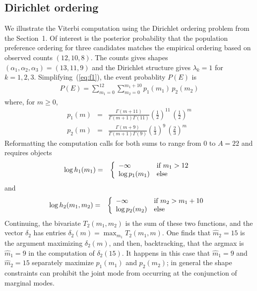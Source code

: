 \subsection{Dirichlet ordering}
We illustrate the Viterbi computation using the Dirichlet ordering
problem from the Section~1.  Of interest is the posterior probability that
the population preference ordering for three candidates matches the
empirical ordering based on observed counts $(12,10,8)$. The counts
gives shapes $(\alpha_1,\alpha_2,\alpha_3)= (13,11,9)$ and 
the Dirichlet structure gives $\lambda_k=1$
for $k=1,2,3$.  Simplifying~(\ref{eq:f1}), the event probablity $P(E)$ is
\begin{eqnarray*}
P(E) = \sum_{m_1=0}^{12} \sum_{m_2 = 0}^{m_1+10} p_1(m_1) \, p_2(m_2)
\end{eqnarray*}
where, for $m \geq 0$,
\begin{eqnarray*}
p_1(m) &=& \frac{ \Gamma(m+11)}{\Gamma(m+1) \Gamma(11) }
  \left( \frac{1}{2} \right )^{ 11 } \, \left( \frac{1}{2} \right)^m  \\
p_2(m) &=& \frac{ \Gamma(m+9) }{ \Gamma(m+1) \Gamma(9) }
  \left( \frac{1}{3} \right )^{ 9 } \, \left( \frac{2}{3} \right)^m 
\end{eqnarray*} 
Reformatting the computation 
calls for both sums to range from $0$ to $A=22$
and requires objects
\begin{eqnarray*}
\log h_1( m_1 ) &= & \left\{ 
                  \begin{array}{ll}
			- \infty & {\mbox {\rm if $m_1 > 12$ } } \\
			\log p_1(m_1) & {\mbox {\rm else} } \\
		  \end{array}
		\right.
\end{eqnarray*}
and
\begin{eqnarray*}
\log h_2( m_1, m_2 ) &= & \left\{ 
                  \begin{array}{ll}
			- \infty & {\mbox {\rm if $m_2 > m_1+ 10$ } } \\
			\log p_2(m_2) & {\mbox {\rm else} } \\
		  \end{array}
		\right.
\end{eqnarray*}
Continuing, the bivariate $T_2(m_1,m_2)$ is the sum of these two functions,
and the vector $\delta_2$ has entries 
 $\delta_2(m) = \max_{m_1} T_2(m_1,m) $.  One finds that $\hat m_2=15$
is the argument maximizing $\delta_2(m)$, and then, backtracking, that
the argmax is $\hat m_1 =  9$ in the computation of $\delta_2(15)$. 
It happens in this case that $\hat m_1 = 9$ and $\hat m_2=15$ separately
maximize $p_1(m_1)$ and $p_2(m_2)$; in general the shape constraints 
can prohibit the joint mode from occurring at the conjunction of marginal
modes.


